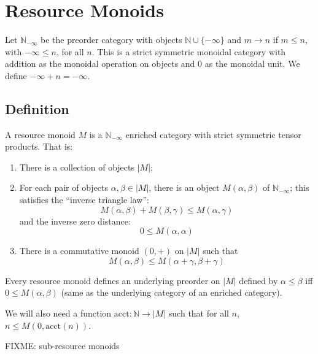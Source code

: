 \documentclass{workingnote}
\newcommand{\account}{\mathrm{acct}}
\begin{document}
\section{Resource Monoids}

\newcommand{\diffcat}{\mathbb{N}_{-\infty}}

Let $\diffcat$ be the preorder category with objects
$\mathbb{N} \cup \{-\infty\}$ and $m \to n$ if $m \leq n$, with
$-\infty \leq n$, for all $n$. This is a strict symmetric monoidal
category with addition as the monoidal operation on objects and $0$ as
the monoidal unit. We define $-\infty + n = -\infty$.

\subsection{Definition}


A resource monoid $M$ is a $\diffcat$ enriched category with strict
symmetric tensor products. That is:
\begin{enumerate}
\item There is a collection of objects $|M|$;
\item For each pair of objects $\alpha,\beta \in |M|$, there is an
  object $M(\alpha,\beta)$ of $\diffcat$; this satisfies the ``inverse
  triangle law'':
  \begin{displaymath}
    M(\alpha, \beta) + M(\beta, \gamma) \leq M(\alpha, \gamma)
  \end{displaymath}
  and the inverse zero distance:
  \begin{displaymath}
    0 \leq M(\alpha,\alpha)
  \end{displaymath}
\item There is a commutative monoid $(0,+)$ on $|M|$ such that
  \begin{displaymath}
    M(\alpha,\beta) \leq M(\alpha+\gamma,\beta+\gamma)
  \end{displaymath}
\end{enumerate}

Every resource monoid defines an underlying preorder on $|M|$ defined
by $\alpha \leq \beta$ iff $0 \leq M(\alpha, \beta)$ (same as the
underlying category of an enriched category).

We will also need a function $\account : \mathbb{N} \to |M|$ such that
for all $n$, $n \leq M(0,\account(n))$.

FIXME: sub-resource monoids
\end{document}
